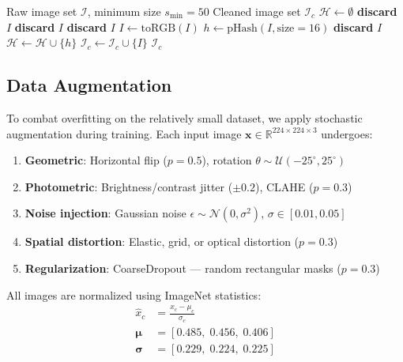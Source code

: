 \documentclass[10pt,a4paper,twocolumn]{article}
\begin{document}
\begin{algorithm}[H]
\caption{Data Cleaning Pipeline}
\label{alg:cleaning}
\begin{algorithmic}[1]
\REQUIRE Raw image set $\mathcal{I}$, minimum size $s_{\min}=50$
\ENSURE Cleaned image set $\mathcal{I}_c$
\STATE $\mathcal{H} \leftarrow \emptyset$ 
        \STATE \textbf{discard} $I$ 
        \STATE \textbf{discard} $I$ 
        \STATE \textbf{discard} $I$ 
    \ELSE
        \STATE $I \leftarrow \text{toRGB}(I)$
        \STATE $h \leftarrow \text{pHash}(I, \text{size}=16)$
            \STATE \textbf{discard} $I$ 
        \ELSE
            \STATE $\mathcal{H} \leftarrow \mathcal{H} \cup \{h\}$
            \STATE $\mathcal{I}_c \leftarrow \mathcal{I}_c \cup \{I\}$
        \ENDIF
    \ENDIF
\ENDFOR
\RETURN $\mathcal{I}_c$
\end{algorithmic}
\end{algorithm}

\subsection{Data Augmentation}

To combat overfitting on the relatively small dataset, we apply stochastic augmentation during training. Each input image $\mathbf{x} \in \mathbb{R}^{224\times224\times3}$ undergoes:

\begin{enumerate}
\item \textbf{Geometric}: Horizontal flip ($p=0.5$), rotation $\theta \sim \mathcal{U}(-25^\circ, 25^\circ)$
\item \textbf{Photometric}: Brightness/contrast jitter ($\pm 0.2$), CLAHE ($p=0.3$)
\item \textbf{Noise injection}: Gaussian noise $\epsilon \sim \mathcal{N}(0, \sigma^2)$, $\sigma \in [0.01, 0.05]$
\item \textbf{Spatial distortion}: Elastic, grid, or optical distortion ($p=0.3$)
\item \textbf{Regularization}: CoarseDropout --- random rectangular masks ($p=0.3$)
\end{enumerate}

All images are normalized using ImageNet statistics:
\begin{align}
\hat{x}_c &= \frac{x_c - \mu_c}{\sigma_c} \label{eq:normalize}\\[4pt]
\boldsymbol{\mu} &= [0.485,\; 0.456,\; 0.406] \nonumber\\
\boldsymbol{\sigma} &= [0.229,\; 0.224,\; 0.225] \nonumber
\end{align}
\end{document}
